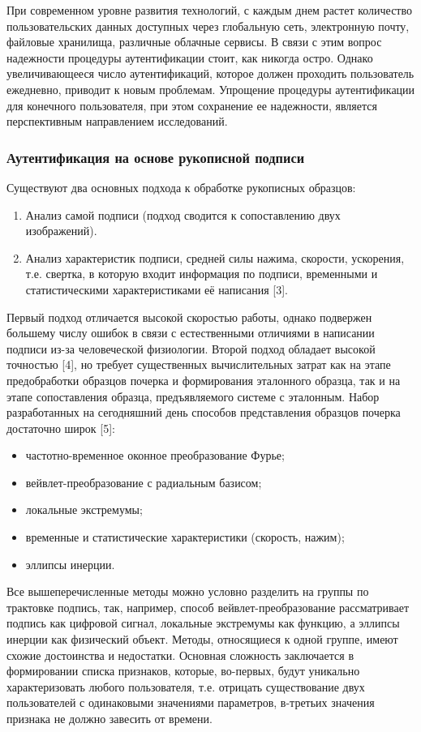 При современном уровне развития технологий, с каждым днем растет количество пользовательских данных доступных через глобальную сеть, электронную почту, файловые хранилища, различные облачные сервисы. В связи с этим вопрос надежности процедуры аутентификации стоит, как никогда остро. Однако увеличивающееся число аутентификаций, которое должен проходить пользователь ежедневно, приводит к новым проблемам. Упрощение процедуры аутентификации для конечного пользователя, при этом сохранение ее надежности, является перспективным направлением исследований.
\subsubsection{Аутентификация на основе рукописной подписи}
Существуют два основных подхода к обработке рукописных образцов:
\begin{enumerate}
  \item Анализ самой подписи (подход сводится к сопоставлению двух изображений).
  \item Анализ характеристик подписи, средней силы нажима, скорости, ускорения, т.е. свертка, в которую входит информация по подписи, временными и статистическими характеристиками её написания [3].
\end{enumerate}

Первый подход отличается высокой скоростью работы, однако подвержен большему числу ошибок в связи с естественными отличиями в написании подписи из-за человеческой физиологии.
Второй подход обладает высокой точностью [4], но требует существенных вычислительных затрат как на этапе предобработки образцов почерка и формирования эталонного образца, так и на этапе сопоставления образца, предъявляемого системе с эталонным.
Набор разработанных на сегодняшний день способов представления образцов почерка достаточно широк [5]:
\begin{itemize}
  \item частотно-временное оконное преобразование Фурье;
  \item вейвлет-преобразование с радиальным базисом;
  \item локальные экстремумы;
  \item временные и статистические характеристики (скорость, нажим);
  \item эллипсы инерции.
\end{itemize}

Все вышеперечисленные методы можно условно разделить на группы по трактовке подпись, так, например, способ вейвлет-преобразование рассматривает подпись как цифровой сигнал, локальные экстремумы как функцию, а эллипсы инерции как физический объект. Методы, относящиеся к одной группе, имеют схожие достоинства и недостатки.
Основная сложность заключается в формировании списка признаков, которые, во-первых, будут уникально характеризовать любого пользователя, т.е. отрицать существование двух пользователей с одинаковыми значениями параметров, в-третьих значения признака не должно завесить от времени.
